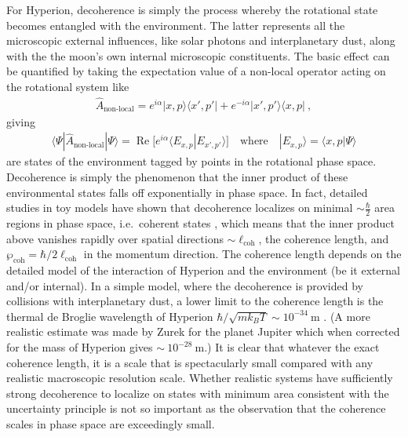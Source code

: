\documentclass[12pt]{article}
\theoremstyle{plain}
\theoremstyle{definition}
\theoremstyle{remark}
\newcommand{\RE}{\operatorname{Re}}
\def\bra#1{\langle #1|}
\def\ket#1{| #1\rangle}
\newcommand{\EQ}[1]{\begin{equation}\begin{split} #1
\end{split}\end{equation}}
\begin{document}
For Hyperion, decoherence is simply the process whereby the rotational state becomes entangled with the environment.
The latter represents all the microscopic external influences, like solar photons and interplanetary dust, along with the 
the moon's own internal microscopic constituents. The basic effect can be quantified by taking the expectation value of a non-local operator acting on the rotational system like
\EQ{
\hat A_\text{non-local}=e^{i\alpha}\ket{x,p}\bra{x',p'}+e^{-i\alpha}\ket{x',p'}\bra{x,p}\ ,
\label{ppp}
}
giving
\EQ{
\bra{\Psi}\hat A_\text{non-local}\ket{\Psi}=\RE\Big[e^{i\alpha}\bra{E_{x,p}}E_{x',p'}\rangle\Big]\quad\text{where}\quad\ket{E_{x,p}}=\bra{x,p}\Psi\rangle
} 
are states of the environment tagged by points in the rotational phase space. Decoherence is simply the phenomenon that the inner product of these environmental states falls off exponentially in phase space. In fact, detailed studies in toy models have shown that decoherence localizes on minimal $\sim\frac\hbar2$ area regions in phase space, i.e.~coherent states \cite{ZHP}, which means that the inner product above vanishes rapidly over spatial directions $\sim\ell_\text{coh}$, the coherence length, and $\wp_\text{coh}=\hbar/2\ell_\text{coh}$ in the momentum direction. The coherence length
depends on the detailed model of the interaction of Hyperion and the environment (be it external and/or internal).
In a simple model, where the decoherence is provided by collisions with interplanetary dust, a lower limit to the coherence length is the thermal de Broglie wavelength of Hyperion $\hbar/\sqrt{mk_BT}\sim10^{-34}\ \text{m}$ \cite{Joos:1984uk}.
(A more realistic estimate was made by Zurek \cite{Zurek2} for the planet Jupiter which when corrected for the mass of Hyperion gives $\sim\ 10^{-28}\ \text{m}$.) 
It is clear that whatever the exact coherence length, it is a scale  that is spectacularly small compared with any realistic macroscopic resolution scale. Whether realistic systems have sufficiently strong decoherence to localize on states with minimum area consistent with the uncertainty principle is not so important as the observation that the coherence scales in phase space are exceedingly small.
\end{document}
